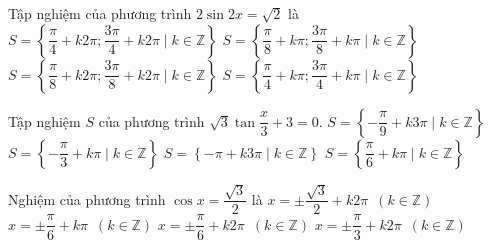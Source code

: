 \begin{ex}%
	Tập nghiệm  của phương trình $2\sin 2x=\sqrt{2}$ là
	\choice 
		{$S=\left\lbrace\dfrac{\pi}{4}+k2\pi;\dfrac{3\pi}{4}+k2\pi\mid  k\in\mathbb{Z}\right\rbrace$}
		{\True $S=\left\lbrace\dfrac{\pi}{8}+k\pi;\dfrac{3\pi}{8}+k\pi\mid k\in\mathbb{Z}\right\rbrace$} 
		 {$S=\left\lbrace\dfrac{\pi}{8}+k2\pi;\dfrac{3\pi}{8}+k2\pi\mid k\in\mathbb{Z}\right\rbrace$}
		{$S=\left\lbrace\dfrac{\pi}{4}+k\pi;\dfrac{3\pi}{4}+k\pi\mid k\in\mathbb{Z}\right\rbrace$} 
\end{ex}

\begin{ex}%
	Tập nghiệm $S$ của phương trình $\sqrt{3}\tan\dfrac{x}{3}+3=0$. 
	 \choice
		 {$S=\left\lbrace-\dfrac{\pi}{9}+k3\pi\mid k\in\mathbb{Z}\right\rbrace$}
		 {$S=\left\lbrace-\dfrac{\pi}{3}+k\pi\mid k\in\mathbb{Z}\right\rbrace$}
		 {\True $S=\left\lbrace-\pi+k3\pi\mid k\in\mathbb{Z}\right\rbrace$}
		{$S=\left\lbrace\dfrac{\pi}{6}+k\pi\mid k\in\mathbb{Z}\right\rbrace$} 
\end{ex}

\begin{ex}%
	Nghiệm của phương  trình $\cos x=\dfrac{\sqrt{3}}{2}$ là
	\choice 
		{$x= \pm  \dfrac{\sqrt{3}}{2}+k2\pi$ $\,(k \in \mathbb{Z})$}
		{$x= \pm \dfrac{\pi}{6}+k  \pi$ $\,(k \in \mathbb{Z})$}
		{\True $x= \pm \dfrac{\pi}{6}+k2\pi$ $\,(k  \in \mathbb{Z})$}
		 {$x= \pm \dfrac{\pi}{3}+k2\pi$ $\,(k \in \mathbb{Z})$}
\end{ex}

